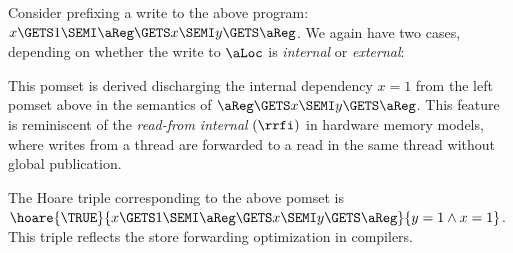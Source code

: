 Consider prefixing a write to the above program:
\begin{math}
  x \GETS 1 \SEMI
  \aReg\GETS x\SEMI
  y\GETS \aReg
\end{math}.
We again have two cases, depending on whether the write to $\aLoc$ is \emph{internal}
or \emph{external}:
\begin{displaymathsmall}
\qquad
{} 
\end{displaymathsmall}
This pomset is derived discharging the internal
dependency $x=1$ from the left pomset above in the semantics of
$\aReg\GETS x\SEMI y\GETS \aReg$.  This feature is reminiscent of the
\emph{read-from internal} $({\rrfi})$ in hardware memory models, where writes
from a thread are forwarded to a read in the same thread without global
publication.

The Hoare triple corresponding to the above pomset is
$\hoare{\TRUE}{x \GETS 1\SEMI \aReg \GETS x \SEMI y\GETS \aReg}{y =1\land x=1}$.
This triple reflects the store forwarding optimization in compilers.

